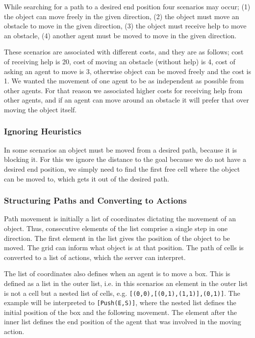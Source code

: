 While searching for a path to a desired end position four scenarios may occur; (1) the object can move freely in the given direction, (2) the object must move an obstacle to move in the given direction, (3) the object must receive help to move an obstacle, (4) another agent must be moved to move in the given direction.

These scenarios are associated with different costs, and they are as follows; cost of receiving help is 20, cost of moving an obstacle (without help) is 4, cost of asking an agent to move is 3, otherwise object can be moved freely and the cost is 1.
We wanted the movement of one agent to be as independent as possible from other agents.
For that reason we associated higher costs for receiving help from other agents, and if an agent can move around an obstacle it will prefer that over moving the object itself.

\subsubsection{Ignoring Heuristics}

In some scenarios an object must be moved from a desired path, because it is blocking it.
For this we ignore the distance to the goal because we do not have a desired end position, we simply need to find the first free cell where the object can be moved to, which gets it out of the desired path.

\subsubsection{Structuring Paths and Converting to Actions}

Path movement is initially a list of coordinates dictating the movement of an object.
Thus, consecutive elements of the list comprise a single step in one direction.
The first element in the list gives the position of the object to be moved.
The grid can inform what object is at that position.
The path of cells is converted to a list of actions, which the server can interpret.

The list of coordinates also defines when an agent is to move a box.
This is defined as a list in the outer list, i.e. in this scenarios an element in the outer list is not a cell but a nested list of cells, e.g. \texttt{[(0,0),[(0,1),(1,1)],(0,1)]}.
The example will be interpreted to \texttt{[Push(E,S)]}, where the nested list defines the initial position of the box and the following movement.
The element after the inner list defines the end position of the agent that was involved in the moving action.
